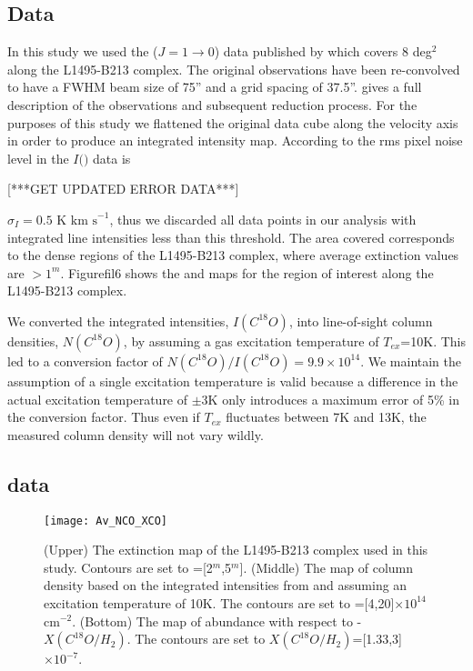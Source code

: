 \documentclass{aa}
\begin{document}
\subsection{\eco Data}
In this study we used the \eco ($J=1\to 0$) data published by \citet{hacar13} which covers 8 deg$^2$ along the L1495-B213 complex. The original observations have been re-convolved to have a FWHM beam size of 75'' and a grid spacing of 37.5''. \citet{hacar13} gives a full description of the observations and subsequent reduction process. For the purposes of this study we flattened the original data cube along the velocity axis in order to produce an integrated intensity map. According to \citet{hacar13} the rms pixel noise level in the $I($\eco$)$ data is 

[***GET UPDATED ERROR DATA***] 

$\sigma_I = 0.5\text{ K km s}^{-1}$, thus we discarded all data points in our analysis with integrated line intensities less than this threshold. The area covered corresponds to the dense regions of the L1495-B213 complex, where average extinction values are \av$>1^m$. Figure{fil6} shows the \av and \eco maps for the region of interest along the L1495-B213 complex.

We converted the integrated intensities, $I(C^{18}O)$, into line-of-sight column densities, $N(C^{18}O)$, by assuming a gas excitation temperature of $T_{ex}$=10K. This led to a conversion factor of $N(C^{18}O)/I(C^{18}O)=9.9 \times 10^{14}$. We maintain the assumption of a single excitation temperature is valid because a difference in the actual excitation temperature of $\pm3$K only introduces a maximum error of 5\% in the conversion factor. Thus even if $T_{ex}$ fluctuates between 7K and 13K, the measured column density will not vary wildly.

\subsection{\av data}

    \begin{figure}
    \centering
    \texttt{[image: Av\_NCO\_XCO]}
    \caption{(Upper) The extinction map of the L1495-B213 complex used in this study. Contours are set to \av=[2$^m$,5$^m$]. (Middle) The map of \eco column density based on the integrated \eco intensities from \citet{hacar13} and assuming an excitation temperature of 10K. The contours are set to \neco=[4,20]$\times 10^{14}$ cm$^{-2}$. (Bottom) The map of \eco abundance with respect to \htwo - $X(C^{18}O/H_2)$. The contours are set to $X(C^{18}O/H_2)$=[1.33,3]$\times 10^{-7}$.}
    \label{fil6}
    \end{figure}
\end{document}
